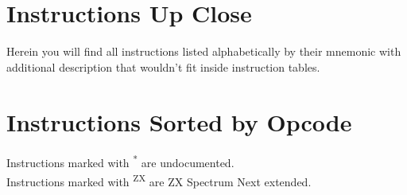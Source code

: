 \documentclass[twoside,openright,a4paper]{book}
\begin{document}
\chapter{Instructions Up Close}
\label{instruction_details}

Herein you will find all instructions listed alphabetically by their mnemonic with additional description that wouldn't fit inside instruction tables.



\chapter{Instructions Sorted by Opcode}

Instructions marked with \textsuperscript{*} are undocumented.\\
Instructions marked with \textsuperscript{ZX} are ZX Spectrum Next extended.
\end{document}
